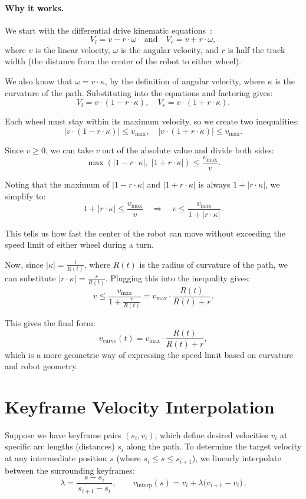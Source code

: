 \documentclass[11pt]{article}
\begin{document}
\paragraph{Why it works.}
We start with the differential drive kinematic equations~\cite{lavalle}:
\[
V_l = v - r \cdot \omega \quad \text{and} \quad V_r = v + r \cdot \omega,
\]
where \(v\) is the linear velocity, \(\omega\) is the angular velocity, and \(r\) is half the track width (the distance from the center of the robot to either wheel).

We also know that \(\omega = v \cdot \kappa\), by the definition of angular velocity, where \(\kappa\) is the curvature of the path. Substituting into the equations and factoring gives:
\[
V_l = v \cdot (1 - r \cdot \kappa), \quad V_r = v \cdot (1 + r \cdot \kappa).
\]

Each wheel must stay within its maximum velocity, so we create two inequalities:
\[
|v \cdot (1 - r \cdot \kappa)| \le v_{\max}, \quad |v \cdot (1 + r \cdot \kappa)| \le v_{\max}.
\]

Since \(v \ge 0\), we can take \(v\) out of the absolute value and divide both sides:
\[
\max\left(|1 - r \cdot \kappa|,\; |1 + r \cdot \kappa|\right) \le \frac{v_{\max}}{v}.
\]

Noting that the maximum of \(|1 - r \cdot \kappa|\) and \(|1 + r \cdot \kappa|\) is always \(1 + |r \cdot \kappa|\), we simplify to:
\[
1 + |r \cdot \kappa| \le \frac{v_{\max}}{v} \quad \Rightarrow \quad v \le \frac{v_{\max}}{1 + |r \cdot \kappa|}.
\]

This tells us how fast the center of the robot can move without exceeding the speed limit of either wheel during a turn.

Now, since \(|\kappa| = \frac{1}{R(t)}\), where \(R(t)\) is the radius of curvature of the path, we can substitute \(|r \cdot \kappa| = \frac{r}{R(t)}\). Plugging this into the inequality gives:
\[
v \le \frac{v_{\max}}{1 + \frac{r}{R(t)}} = v_{\max} \cdot \frac{R(t)}{R(t) + r}.
\]

This gives the final form:
\[
v_{\text{curve}}(t) = v_{\max} \cdot \frac{R(t)}{R(t) + r},
\]
which is a more geometric way of expressing the speed limit based on curvature and robot geometry.

\section{Keyframe Velocity Interpolation}

Suppose we have keyframe pairs \((s_i, v_i)\), which define desired velocities \(v_i\) at specific arc lengths (distances) \(s_i\) along the path. To determine the target velocity at any intermediate position \(s\) (where $s_i \le s \le s_{i+1}$), we linearly interpolate between the surrounding keyframes:
\[
\lambda = \frac{s - s_i}{\,s_{i+1} - s_i\,}, 
\qquad
v_{\text{interp}}(s) = v_i + \lambda\big(v_{i+1} - v_i\big)\,.
\]
\end{document}
